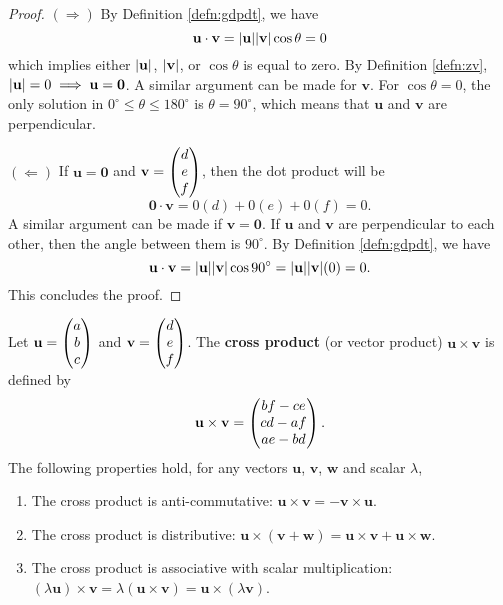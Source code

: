 \documentclass[12pt]{article}
\renewcommand{\vec}{\mathbf}
\begin{document}
\begin{proof}
	\((\Rightarrow)\) By Definition \ref{defn:gdpdt}, we have
	\[ \vec{u} \cdot \vec{v} = \abs{\vec{u}} \abs{\vec{v}} \cos \theta = 0\] 
	which implies either \(\abs{\vec{u}}\), \(\abs{\vec{v}}\), or \(\cos \theta\) is equal to zero.
	By Definition \ref{defn:zv}, \(\abs{\vec{u}} = 0 \implies \vec{u} = \vec{0}\). 
	A similar argument can be made for \(\vec{v}\).
	For \(\cos \theta = 0\), the only solution in \(0^\circ \leq \theta \leq 180^\circ\) is \(\theta = 90^\circ\), which means that \(\vec{u}\) and \(\vec{v}\) are perpendicular.

	\((\Leftarrow)\) If \(\vec{u} = \vec{0}\) and \(\vec{v} = \cvec{d \\ e \\ f}\), then the dot product will be 
	\[ \vec{0} \cdot \vec{v} = 0(d) + 0(e) + 0(f) = 0. \] 
	A similar argument can be made if \(\vec{v} = \vec{0}\).
	If \(\vec{u}\) and \(\vec{v}\) are perpendicular to each other, then the angle between them is \(90^\circ\).
	By Definition \ref{defn:gdpdt}, we have 
	\[ \vec{u} \cdot \vec{v} = \abs{\vec{u}} \abs{\vec{v}} \cos 90^\circ = \abs{\vec{u}} \abs{\vec{v}} (0) = 0. \] 
	This concludes the proof.
\end{proof}


\begin{defn}
	Let \(\vec{u} = \cvec{a \\ b \\ c}\) and \(\vec{v} = \cvec{d \\ e \\ f}\).
	The \textbf{cross product} (or vector product) \(\vec{u} \times \vec{v}\) is defined by
	\[ \vec{u} \times \vec{v} = \cvec{bf - ce \\ cd - af \\ ae - bd}.  \] 
	The following properties hold, for any vectors \(\vec{u}\), \(\vec{v}\), \(\vec{w}\) and scalar \(\lambda\),
	\begin{enumerate}
		\item The cross product is anti-commutative: \(\vec{u} \times \vec{v} = -\vec{v} \times \vec{u}\).
		\item The cross product is distributive: \(\vec{u} \times (\vec{v} + \vec{w}) = \vec{u} \times \vec{v} + \vec{u} \times \vec{w}\). 
		\item The cross product is associative with scalar multiplication: \((\lambda \vec{u}) \times \vec{v} = \lambda (\vec{u} \times \vec{v}) = \vec{u} \times (\lambda \vec{v})\).
	\end{enumerate}
\end{defn}
\end{document}
